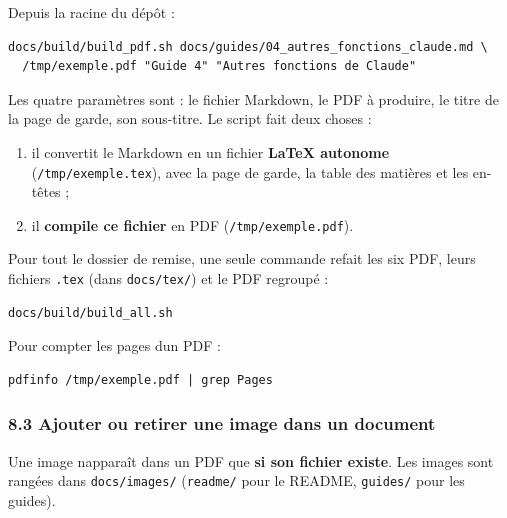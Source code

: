 \documentclass[
  french,
  11pt,
  a4paper,
]{article}
\providecommand{\tightlist}{%
  \setlength{\itemsep}{0pt}\setlength{\parskip}{0pt}}
\begin{document}
Depuis la racine du dépôt :

\begin{Verbatim}[breaklines=true,breakanywhere=true,fontsize=\small,frame=leftline,framerule=1.6pt,rulecolor=\color{credixblue},framesep=3mm,xleftmargin=2mm,xrightmargin=1mm]
docs/build/build_pdf.sh docs/guides/04_autres_fonctions_claude.md \
  /tmp/exemple.pdf "Guide 4" "Autres fonctions de Claude"
\end{Verbatim}

Les quatre paramètres sont : le fichier Markdown, le PDF à produire, le
titre de la page de garde, son sous-titre. Le script fait deux choses :

\begin{enumerate}
\def\labelenumi{\arabic{enumi}.}
\tightlist
\item
  il convertit le Markdown en un fichier \textbf{LaTeX autonome}
  (\texttt{/\allowbreak{}tmp/\allowbreak{}exemple.\allowbreak{}tex}),
  avec la page de garde, la table des matières et les en-têtes ;
\item
  il \textbf{compile ce fichier} en PDF
  (\texttt{/\allowbreak{}tmp/\allowbreak{}exemple.\allowbreak{}pdf}).
\end{enumerate}

Pour tout le dossier de remise, une seule commande refait les six PDF,
leurs fichiers \texttt{.tex} (dans \texttt{docs/tex/}) et le PDF
regroupé :

\begin{Verbatim}[breaklines=true,breakanywhere=true,fontsize=\small,frame=leftline,framerule=1.6pt,rulecolor=\color{credixblue},framesep=3mm,xleftmargin=2mm,xrightmargin=1mm]
docs/build/build_all.sh
\end{Verbatim}

Pour compter les pages d\textquotesingle un PDF :

\begin{Verbatim}[breaklines=true,breakanywhere=true,fontsize=\small,frame=leftline,framerule=1.6pt,rulecolor=\color{credixblue},framesep=3mm,xleftmargin=2mm,xrightmargin=1mm]
pdfinfo /tmp/exemple.pdf | grep Pages
\end{Verbatim}

\subsubsection{8.3 Ajouter ou retirer une image dans un
document}\label{83-ajouter-ou-retirer-une-image-dans-un-document}

Une image n\textquotesingle apparaît dans un PDF que \textbf{si son
fichier existe}. Les images sont rangées dans \texttt{docs/images/}
(\texttt{readme/} pour le README, \texttt{guides/} pour les guides).
\end{document}
